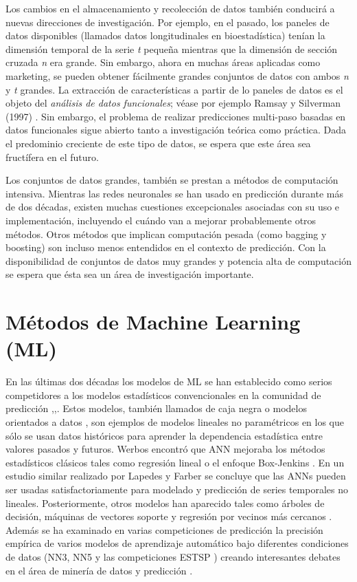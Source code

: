 \documentclass{llncs}
\begin{document}
Los cambios en el almacenamiento y recolección de datos también conducirá a nuevas direcciones de investigación. Por ejemplo, en el pasado, los paneles de datos disponibles (llamados datos longitudinales en bioestadística) tenían la dimensión temporal de la serie \emph{t} pequeña mientras que la dimensión de sección cruzada \emph{n} era grande. Sin embargo, ahora en muchas áreas aplicadas como marketing, se pueden obtener fácilmente grandes conjuntos de datos con ambos \emph{n} y \emph{t} grandes. La extracción de características a partir de lo paneles de datos es el objeto del \emph{análisis de datos funcionales}; véase por ejemplo  Ramsay y Silverman (1997) \cite{Ramsay1997}. Sin embargo, el problema de realizar predicciones multi-paso basadas en datos funcionales sigue abierto tanto a investigación teórica como práctica. Dada el predominio creciente de este tipo de datos, se espera que este área sea fructífera en el futuro.

Los conjuntos de datos grandes, también se prestan a métodos de computación intensiva. Mientras las redes neuronales se han usado en predicción durante más de dos décadas, existen muchas cuestiones excepcionales asociadas con su uso e implementación, incluyendo el cuándo van a mejorar probablemente otros métodos. Otros métodos que implican computación pesada (como bagging y boosting) son incluso menos entendidos en el contexto de predicción. Con la disponibilidad de conjuntos de datos muy grandes y potencia alta de computación se espera que ésta sea un área de investigación importante.

\section{Métodos de Machine Learning (ML)}
En las últimas dos décadas los modelos de ML se han establecido como serios competidores a los modelos estadísticos convencionales en la comunidad de predicción \cite{Ahmed2010594},\cite{Palit2005},\cite{Zhang199835}. Estos modelos, también llamados de caja negra o modelos orientados a datos \cite{Mitchell1997}, son ejemplos de modelos lineales no paramétricos en los que sólo se usan datos históricos para aprender la dependencia estadística entre valores pasados y futuros. Werbos encontró que ANN mejoraba los métodos estadísticos clásicos tales como regresión lineal o el enfoque Box-Jenkins \cite{Werbos1974} \cite{Werbos1988339}. En un estudio similar realizado por Lapedes y Farber \cite{Lapedes1987} se concluye que las ANNs pueden ser usadas satisfactoriamente para modelado y predicción de series temporales no lineales. Posteriormente, otros modelos han aparecido tales como árboles de decisión, máquinas de vectores soporte y regresión por vecinos más cercanos \cite{Hastie2001} \cite{Alpaydin2004}. Además se ha examinado en varias competiciones de predicción la precisión empírica de varios modelos de aprendizaje automático bajo diferentes condiciones de datos (NN3, NN5 y las competiciones ESTSP \cite{Crone2009456}\cite{Crone}\cite{Lendasse2007}) creando interesantes debates en el área de minería de datos y predicción \cite{Hand2008}\cite{Price2009452}\cite{Crone2009456}.
\end{document}
